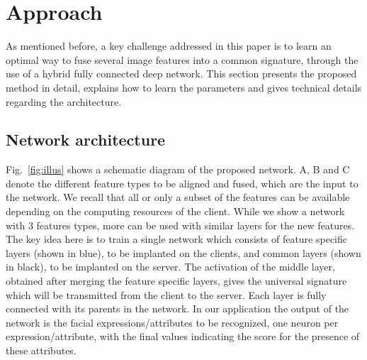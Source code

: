 \documentclass{sig-alternate-05-2015}
\begin{document}
\section{Approach}\label{sec:approach}
As mentioned before, a key challenge addressed in this paper is to learn an optimal way to fuse several image features into a common signature, through the use of a hybrid fully connected deep network. This section presents the proposed method in detail, explains how to learn the parameters and gives technical details regarding the architecture.

\subsection{Network architecture}

Fig.~\ref{fig:illus} shows a schematic diagram of the proposed network. A, B and C denote the different feature types to be aligned and fused, which are the input to the network. 
We recall that all or only a subset of the features can be available depending on the computing resources of the client. While we show a network with 3 features types, more can be used with similar layers for the new features. The key idea here is to train a single network which consists of feature specific layers (shown in blue), to be implanted on the clients, and common layers (shown in black), to be implanted on the server. The activation of the middle layer, obtained after merging the feature specific layers, gives the universal signature which will be transmitted from the client to the server. Each layer is fully connected with its parents in the network. In our application the output of the network is the facial expressions/attributes to be recognized, one neuron per expression/attribute, with the final values indicating the score for the presence of these attributes.
\end{document}
